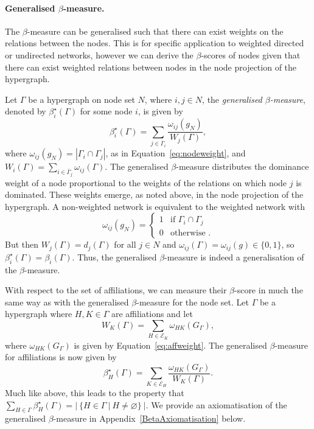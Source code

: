 \paragraph{Generalised $\beta$-measure.}

The $\beta$-measure can be generalised such that there can exist weights on the relations between the nodes. This is for specific application to weighted directed or undirected networks, however we can derive the $\beta$-scores of nodes given that there can exist weighted relations between nodes in the node projection of the hypergraph.

Let $\Gamma$ be a hypergraph on node set $N$, where $i,j \in N$, the \emph{generalised $\beta$-measure}, denoted by $\beta^{\star}_{i}(\Gamma)$ for some node $i$, is given by
\begin{equation}
\beta^{\star}_{i}(\Gamma) = \sum_{j \in \overline{\Gamma}_{i}} \frac{\omega_{ij}(g_{N})}{W_{j}(\Gamma)} ,
\end{equation}
where $\omega_{ij}(g_{N}) = | \Gamma_{i} \cap \Gamma_{j} |$, as in Equation~\ref{eq:nodeweight}, and $W_{i}(\Gamma) = \sum_{i \in \overline{\Gamma}_{j}} \omega_{ij}(\Gamma)$. The generalised $\beta$-measure distributes the dominance weight of a node proportional to the weights of the relations on which node $j$ is dominated. These weights emerge, as noted above, in the node projection of the hypergraph. A non-weighted network is equivalent to the weighted network with
\[
\omega_{ij}(g_{N} ) = \left\{
\begin{array}{ll}
1 & \mbox{if } \Gamma_{i} \cap \Gamma_{j}  \\
0 & \mbox{otherwise .}
\end{array} \right.
\]
But then $W_{j}(\Gamma) = d_{j}(\Gamma)$ for all $j \in N$ and $\omega_{ij}(\Gamma) = \omega_{ij}(g) \in \{0,1\}$, so $\beta^{\star}_{i}(\Gamma) = \beta_{i}(\Gamma)$. Thus, the generalised $\beta$-measure is indeed a generalisation of the $\beta$-measure.

With respect to the set of affiliations, we can measure their $\beta$-score in much the same way as with the generalised $\beta$-measure for the node set. Let $\Gamma$ be a hypergraph where $H, K \in \Gamma$ are affiliations and let
\begin{equation}
W_{K}(\Gamma) = \sum_{H \in \mathcal{E}_{K}} \omega_{HK}(G_{\Gamma}) ,
\end{equation}
where $\omega_{HK}(G_{\Gamma})$ is given by Equation~\ref{eq:affweight}. The generalised $\beta$-measure for affiliations is now given by
\begin{equation}
\beta^{\star}_{H}(\Gamma) = \sum_{K \in \mathcal{E}_{H}} \frac{\omega_{HK}(G_{\Gamma})}{W_{K}(\Gamma)} .
\end{equation}
Much like above, this leads to the property that $\sum_{H \in \Gamma} \beta^{\star}_{H} (\Gamma) = | ~ \{ H \in \Gamma ~ | ~ H \neq \varnothing \} ~ |$. We provide an axiomatisation of the generalised $\beta$-measure in Appendix~\ref{BetaAxiomatisation} below.


